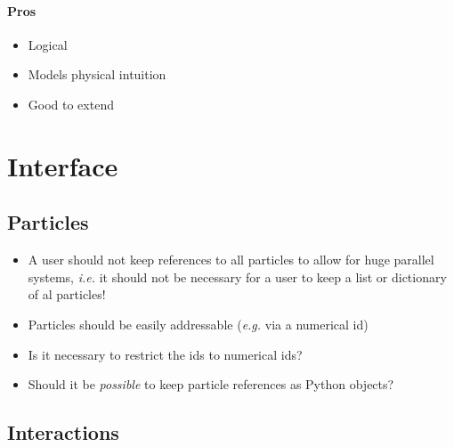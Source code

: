 \documentclass[
a4paper,                        %
11pt,                           %
]{scrartcl}
\newcommand{\ie}{\textit{i.e.}\xspace}
\newcommand{\eg}{\textit{e.g.}\xspace}
\begin{document}
\paragraph{Pros}
\begin{itemize}
\item Logical
\item Models physical intuition
\item Good to extend
\end{itemize}

\clearpage
\section{Interface}

\subsection{Particles}

\begin{itemize}
\item A user should not keep references to all particles to allow for
  huge parallel systems, \ie it should not be necessary for a user to
  keep a list or dictionary of al particles!
\item Particles should be easily addressable (\eg via a numerical id)
\item Is it necessary to restrict the ids to numerical ids?
\item Should it be \emph{possible} to keep particle references as
  Python objects?
\end{itemize}

\subsection{Interactions}
\end{document}
